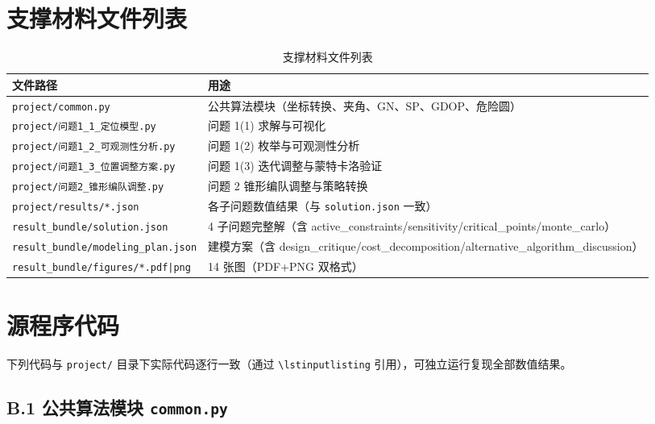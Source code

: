 \documentclass[12pt,a4paper]{ctexart}
\begin{document}
\appendix

\section{支撑材料文件列表}

\begin{table}[H]
\centering
\caption{支撑材料文件列表}
\label{tab:support-files}
\begin{tabular}{ll}
\toprule
文件路径 & 用途 \\
\midrule
\texttt{project/common.py}               & 公共算法模块（坐标转换、夹角、GN、SP、GDOP、危险圆） \\
\texttt{project/问题1\_1\_定位模型.py}     & 问题 1(1) 求解与可视化 \\
\texttt{project/问题1\_2\_可观测性分析.py} & 问题 1(2) 枚举与可观测性分析 \\
\texttt{project/问题1\_3\_位置调整方案.py} & 问题 1(3) 迭代调整与蒙特卡洛验证 \\
\texttt{project/问题2\_锥形编队调整.py}    & 问题 2 锥形编队调整与策略转换 \\
\texttt{project/results/*.json}           & 各子问题数值结果（与 \texttt{solution.json} 一致） \\
\texttt{result\_bundle/solution.json}     & 4 子问题完整解（含 active\_constraints/sensitivity/critical\_points/monte\_carlo） \\
\texttt{result\_bundle/modeling\_plan.json} & 建模方案（含 design\_critique/cost\_decomposition/alternative\_algorithm\_discussion） \\
\texttt{result\_bundle/figures/*.pdf|png} & 14 张图（PDF+PNG 双格式） \\
\bottomrule
\end{tabular}
\end{table}

\section{源程序代码}
\label{app:code}

下列代码与 \texttt{project/} 目录下实际代码逐行一致（通过 \texttt{\textbackslash lstinputlisting} 引用），可独立运行复现全部数值结果。

\subsection*{B.1 公共算法模块 \texttt{common.py}}
\end{document}
